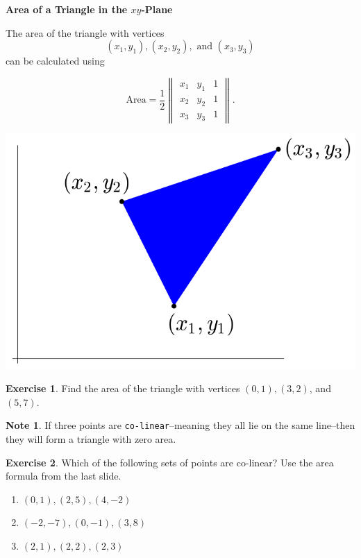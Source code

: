 \documentclass{beamer}
\newcommand{\fn}{\insertframenumber}
\theoremstyle{definition}
\newtheorem{exercise}{Exercise}
\newtheorem*{nb}{Note}
\renewcommand{\emph}[1]{{\color{blue}\texttt{#1}}}
\begin{document}
\begin{frame}{\fn}
	\begin{block}{\textbf{Area of a Triangle in the $xy$-Plane}}
		\begin{minipage}{.65\textwidth}
			The area of the triangle with vertices	\[(x_1,y_1), (x_2,y_2), \text{ and } (x_3,y_3)\] can be calculated using
		
			\[\text{Area}=\frac{1}{2}\begin{Vmatrix}x_1&y_1&1\\x_2&y_2&1\\x_3&y_3&1\end{Vmatrix}.\]
		\end{minipage}
		\begin{minipage}{.3\textwidth}
			\includegraphics[width=\textwidth]{images/triangle}
		\end{minipage}
	\end{block}
	\begin{exercise}
		Find the area of the triangle with vertices $(0,1),(3,2)$, and $(5,7)$.
	\end{exercise}
\end{frame}

\begin{frame}{\fn}
	\begin{nb}
		If three points are \emph{co-linear}--meaning they all lie on the same line--then they will form a triangle with zero area.  
	\end{nb}
	\begin{exercise} Which of the following sets of points are co-linear?  Use the area formula from the last slide.
		\begin{enumerate}[label=(\alph*)]
			\item $(0,1),(2,5),(4,-2)$
			\item $(-2,-7),(0,-1),(3,8)$
			\item $(2,1),(2,2),(2,3)$
		\end{enumerate}
	\end{exercise}
\end{frame}
\end{document}
